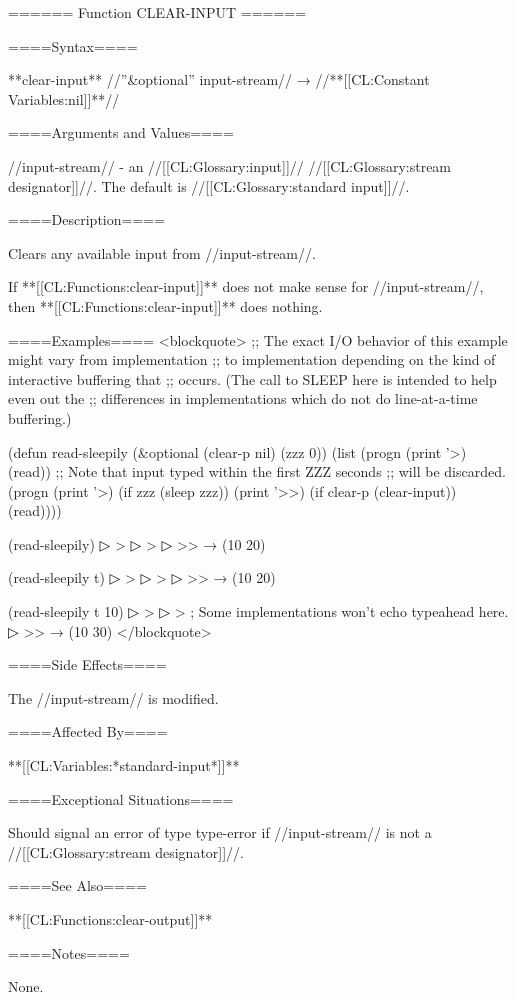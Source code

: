 ====== Function CLEAR-INPUT ======

====Syntax====

**{clear-input}** //''&optional'' input-stream// → //**[[CL:Constant Variables:nil]]**//

====Arguments and Values====

//input-stream// - an //[[CL:Glossary:input]]// //[[CL:Glossary:stream designator]]//. The default is //[[CL:Glossary:standard input]]//.

====Description====

Clears any available input from //input-stream//.

If **[[CL:Functions:clear-input]]** does not make sense for //input-stream//, then **[[CL:Functions:clear-input]]** does nothing.

====Examples==== <blockquote> ;; The exact I/O behavior of this example might vary from implementation ;; to implementation depending on the kind of interactive buffering that ;; occurs. (The call to SLEEP here is intended to help even out the ;; differences in implementations which do not do line-at-a-time buffering.)

(defun read-sleepily (&optional (clear-p nil) (zzz 0)) (list (progn (print '>) (read)) ;; Note that input typed within the first ZZZ seconds ;; will be discarded. (progn (print '>) (if zzz (sleep zzz)) (print '>>) (if clear-p (clear-input)) (read))))

(read-sleepily)
▷ > 
▷ >
▷ >>  → (10 20)

(read-sleepily t)
▷ > 
▷ >
▷ >>  → (10 20)

(read-sleepily t 10)
▷ > 
▷ >  ; Some implementations won't echo typeahead here.
▷ >>  → (10 30) </blockquote>

====Side Effects====

The //input-stream// is modified.

====Affected By====

**[[CL:Variables:*standard-input*]]**

====Exceptional Situations====

Should signal an error of type type-error if //input-stream// is not a //[[CL:Glossary:stream designator]]//.

====See Also====

**[[CL:Functions:clear-output]]**

====Notes====

None.

